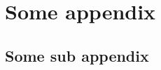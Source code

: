 
\appendix

\chapter{Some appendix} %
\label{chp:some_appendix}


\section{Some sub appendix} %
\label{sec:some-appendix}

\lipsum[1]
